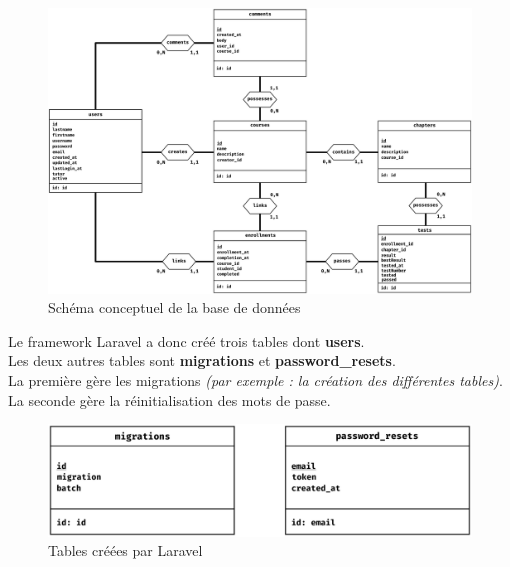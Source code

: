 \begin{figure}[h]
  \centering
  \includegraphics[width=\textwidth]
  {textures/images/DB/Student-Tutor.pdf}
  \caption{Schéma conceptuel de la base de données}
  \label{fig:db2}
\end{figure}

\newpage

Le framework Laravel a donc créé trois tables dont \textbf{users}.\\
Les deux autres tables sont \textbf{migrations} et \textbf{password\_resets}.\\
La première gère les migrations \textit{(par exemple : la création des différentes tables)}. \\
La seconde gère la réinitialisation des mots de passe.

\vspace{0.5cm}

\begin{figure}[h]
  \centering
  \includegraphics[width=\textwidth]
  {textures/images/DB/Other-Laravel.pdf}
  \caption{Tables créées par Laravel}
  \label{fig:db1}
\end{figure}

\vspace{0.5cm}


